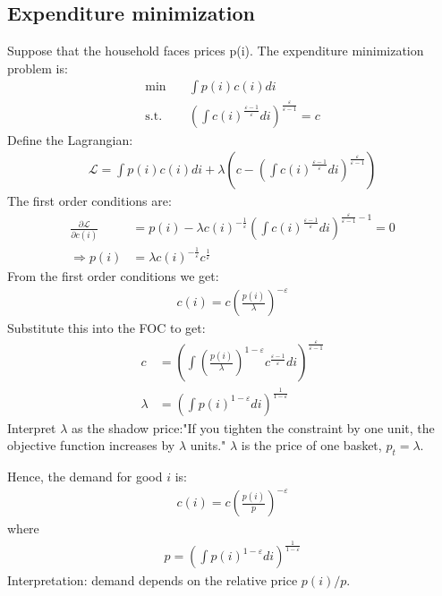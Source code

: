 \subsection{Expenditure minimization}
Suppose that the household faces prices p(i). The expenditure minimization problem is:
\begin{align*}
    \min &\quad \int p(i) c(i) di \\
    \text{s.t.} &\quad \left(\int c(i)^{\frac{\varepsilon-1}{\varepsilon}} di\right)^{\frac{\varepsilon}{\varepsilon-1}} = c
\end{align*}
Define the Lagrangian:
\begin{align*}
    \mathcal{L} = \int p(i) c(i) di + \lambda \left( c - \left(\int c(i)^{\frac{\varepsilon-1}{\varepsilon}} di\right)^{\frac{\varepsilon}{\varepsilon-1}} \right)
\end{align*}
The first order conditions are:
\begin{align*}
    \frac{\partial \mathcal{L}}{\partial c(i)} &= p(i) - \lambda c(i)^{-\frac{1}{\varepsilon}}\left(\int c(i)^{\frac{\varepsilon-1}{\varepsilon}} di\right)^{\frac{\varepsilon}{\varepsilon-1}-1} = 0 \\
    \Rightarrow p(i) &= \lambda c(i)^{-\frac{1}{\varepsilon}}c^{\frac{1}{\varepsilon}}
\end{align*}
From the first order conditions we get:
\begin{align*}
    c(i) = c \left( \frac{p(i)}{\lambda} \right)^{-\varepsilon}
\end{align*}
Substitute this into the FOC to get:
\begin{align*}
    c &= \left( \int \left(\frac{p(i)}{\lambda }\right)^{1-\varepsilon} c^{\frac{\varepsilon-1}{\varepsilon}} di \right)^{\frac{\varepsilon}{\varepsilon-1}} \\
    \lambda &= \left( \int p(i)^{1-\varepsilon} di \right)^{\frac{1}{1-\varepsilon}}
\end{align*}
Interpret $\lambda$ as the shadow price:"If you tighten the
constraint by one unit, the objective function increases by $\lambda$ units."
$\lambda$ is the price of one basket, $p_t = \lambda$.

Hence, the demand for good $i$ is:
\begin{align*}
    c(i) = c \left( \frac{p(i)}{p} \right)^{-\varepsilon}
\end{align*}
where
\begin{align*}
    p = \left( \int p(i)^{1-\varepsilon} di \right)^{\frac{1}{1-\varepsilon}}
\end{align*}
Interpretation: demand depends on the relative price $p(i)/p$.

